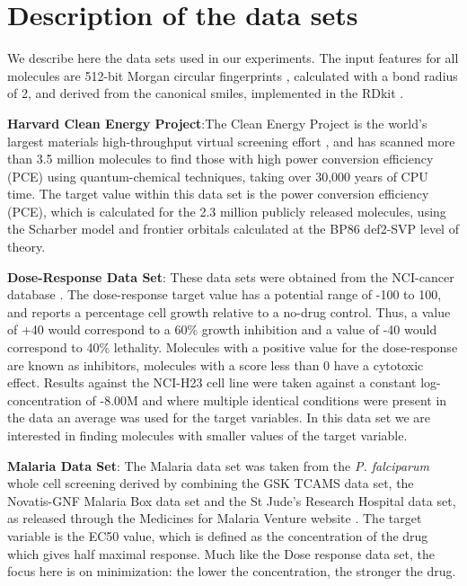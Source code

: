 \section{Description of the data sets}\label{sec:data_sets}

We describe here the data sets used in our experiments. The input features for all molecules are 512-bit Morgan circular fingerprints \cite{Rogers_2010}, calculated with a bond radius of 2, and derived from the canonical smiles, implemented in the RDkit \cite{rdkit}.

\textbf{Harvard Clean Energy Project}:The Clean Energy Project is the world's largest materials high-throughput virtual screening effort \cite{Hachmann_2014,Hachmann_2011}, and has scanned more than 3.5 million molecules to find those with high power conversion efficiency (PCE) using quantum-chemical techniques, taking over 30,000 years of CPU time. The target value within this data set is the power conversion efficiency (PCE), which is calculated for the 2.3 million publicly released molecules, using the Scharber model \cite{Dennler_2008} and frontier orbitals calculated at the BP86 \cite{Perdew_1986,Becke_1993} \/ def2-SVP \cite{Weigend_2005} level of theory.

\textbf{Dose-Response Data Set}: These data sets were obtained from the NCI-cancer database \cite{_nci_}.  The dose-response target value has a potential range of -100 to 100, and reports a percentage cell growth relative to a no-drug control.  Thus, a value of +40 would correspond to a 60\% growth inhibition and a value of -40 would correspond to 40\% lethality.  Molecules with a positive value for the dose-response are known as inhibitors, molecules with a score less than 0 have a cytotoxic effect. Results against the NCI-H23 cell line were taken against a constant log-concentration of -8.00M and where multiple identical conditions were present in the data an average was used for the target variables. In this data set we are interested in finding molecules with  smaller values of the target variable.

\textbf{Malaria Data Set}: The Malaria data set was taken from the \textit{P. falciparum} whole cell screening derived by combining the GSK TCAMS data set, the Novatis-GNF Malaria Box data set and the St Jude's Research Hospital data set, as released through the Medicines for Malaria Venture website \cite{Spangenberg_2013}. The target variable is the EC50 value, which is defined as the concentration of the drug which gives half maximal response. Much like the Dose response data set, the focus here is on minimization: the lower the concentration, the stronger the drug.
